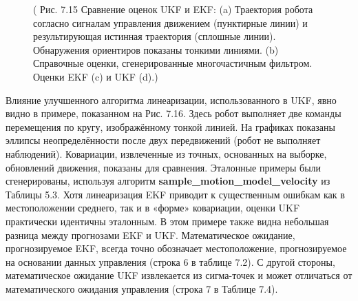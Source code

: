 \documentclass[10pt,a4paper]{article}
\begin{document}
\begin{figure}[H]
	\caption{ (  Рис. 7.15 Сравнение оценок UKF и EKF: (a) Траектория робота согласно сигналам управления движением (пунктирные линии) и результирующая истинная траектория (сплошные линии). Обнаружения ориентиров показаны тонкими линиями. (b) Справочные оценки, сгенерированные многочастичным фильтром. Оценки EKF (c) и UKF (d).)}
	\label{fig:715orig}
\end{figure}

Влияние улучшенного алгоритма линеаризации, использованного в UKF, явно видно в примере, показанном на Рис. 7.16. Здесь робот выполняет две команды перемещения по кругу, изображённому тонкой линией. На графиках показаны эллипсы неопределённости после двух передвижений (робот не выполняет наблюдений). Ковариации, извлеченные из точных, основанных на выборке, обновлений движения, показаны для сравнения. Эталонные примеры были сгенерированы, используя алгоритм \textbf{sample\_motion\_model\_velocity} из Таблицы 5.3. Хотя линеаризация EKF приводит к существенным ошибкам как в местоположении среднего, так и в «форме» ковариации, оценки UKF практически идентичны эталонным. В этом примере также видна небольшая разница между прогнозами EKF и UKF. Математическое ожидание, прогнозируемое EKF, всегда точно обозначает местоположение, прогнозируемое на основании данных управления (строка 6 в таблице 7.2). С другой стороны, математическое ожидание UKF извлекается из сигма-точек и может отличаться от математического ожидания управления (строка 7 в Таблице 7.4).
\end{document}
